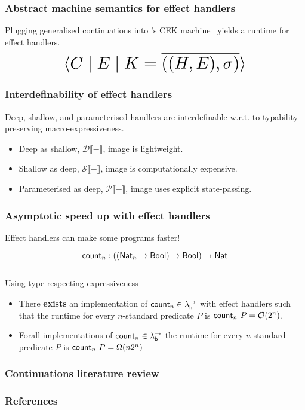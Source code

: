 \documentclass[169,10pt,compress,dvipsnames]{beamer}
\newcommand*{\Scale}[2][4]{\scalebox{#1}{\ensuremath{#2}}}%
\begin{document}
\begin{frame}
  \frametitle{Abstract machine semantics for effect handlers}

  Plugging generalised continuations into \citeauthor{FelleisenF86}'s
  CEK machine~\cite{FelleisenF86} yields a runtime for effect
  handlers.\\[2em]

  \[
    \Scale[2]{\cek{C \mid E \mid K = \overline{((H,E), \sigma)}}}
  \]

\end{frame}

\begin{frame}
  \frametitle{Interdefinability of effect handlers}

  Deep, shallow, and parameterised handlers are interdefinable
  w.r.t. to typability-preserving macro-expressiveness.

  \begin{itemize}
    \item Deep as shallow, $\mathcal{D}\llbracket - \rrbracket$, image is lightweight.
    \item Shallow as deep, $\mathcal{S}\llbracket - \rrbracket$, image is computationally expensive.
    \item Parameterised as deep, $\mathcal{P}\llbracket - \rrbracket$,
      image uses explicit state-passing.
  \end{itemize}
\end{frame}

\begin{frame}
  \frametitle{Asymptotic speed up with effect handlers}

  Effect handlers can make some programs faster!

  \[
    \mathsf{count}_n : ((\mathsf{Nat}_n \to \mathsf{Bool}) \to \mathsf{Bool}) \to \mathsf{Nat}
  \]\\[1em]
  Using type-respecting expressiveness
  \begin{itemize}
  \item There \textbf{exists} an implementation of $\mathsf{count}_n \in \lambda^\rightarrow_{\mathsf{h}}$ with
    effect handlers such that the runtime for every $n$-standard predicate $P$ is
    $\mathsf{count}_n~P = \mathcal{O}(2^n)$.
  \item Forall implementations of $\mathsf{count}_n \in \lambda^\rightarrow_{\mathsf{b}}$ the runtime for every $n$-standard predicate $P$ is $\mathsf{count}_n~P = \Omega(n2^n)$
  \end{itemize}
\end{frame}

\begin{frame}
  \frametitle{Continuations literature review}
\end{frame}

%
%
\begin{frame}%
  \frametitle{References}
  \nocite{*}
  
  
\end{frame}
\end{document}
